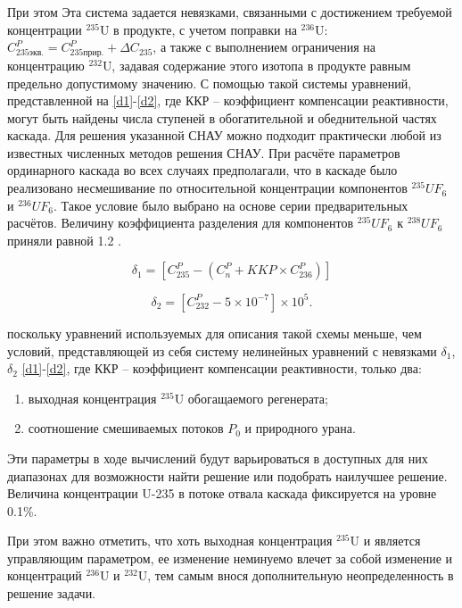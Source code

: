 При этом Эта система задается невязками, связанными с достижением требуемой концентрации $^{235}$U в продукте, с учетом поправки на $^{236}$U: $C_{235 экв.}^{P}=C_{235 прир.}^{P}+\Delta C_{235}$, а также с выполнением ограничения на концентрацию $^{232}$U, задавая содержание этого изотопа в продукте равным предельно допустимому значению. С помощью такой системы уравнений, представленной на \ref{d1}-\ref{d2}, где ККР -- коэффициент компенсации реактивности, могут быть найдены числа ступеней в обогатительной и обеднительной частях каскада. Для решения указанной СНАУ можно подходит практически любой из известных численных методов решения СНАУ. 
При расчёте параметров ординарного каскада во всех случаях предполагали, что в каскаде было реализовано несмешивание по относительной концентрации компонентов $^{235}UF_6$ и $^{236}UF_6$. Такое условие было выбрано на основе серии предварительных расчётов. Величину коэффициента разделения для компонентов  $^{235}UF_6$ к $^{238}UF_6$ приняли равной 1.2  \cite{smirnovEvolutionIsotopicComposition2012}. 

\begin{equation} \label{d1} 
  \delta_1=\left[C_{235}^P-\left(C_n^P+KKP\times C_{236}^P\right)\right]
\end{equation} 

\begin{equation} \label{d2} 
    \delta_2=\left[C_{232}^P-5\times10^{-7}\right]\times10^5.             
\end{equation}


поскольку уравнений используемых для описания такой схемы меньше, чем условий, представляющей из себя систему нелинейных уравнений с невязками $\delta_1$, $\delta_2$ \ref{d1}-\ref{d2}, где ККР -- коэффициент компенсации реактивности, только два:

\begin{enumerate}
  \item выходная концентрация $^{235}$U обогащаемого регенерата;
  \item соотношение смешиваемых потоков $P_0$ и природного урана.
\end{enumerate}

Эти параметры в ходе вычислений будут варьироваться в доступных для них диапазонах для возможности найти решение или подобрать наилучшее решение. Величина концентрации U-235 в потоке отвала каскада фиксируется на уровне 0.1\%. 

При этом важно отметить, что хоть выходная концентрация $^{235}$U и является управляющим параметром, ее изменение неминуемо влечет за собой изменение и концентраций $^{236}$U и $^{232}$U, тем самым внося дополнительную неопределенность в решение задачи.

